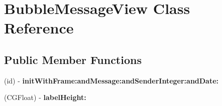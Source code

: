 \hypertarget{interface_bubble_message_view}{
\section{\-Bubble\-Message\-View \-Class \-Reference}
\label{interface_bubble_message_view}
}
\subsection*{\-Public \-Member \-Functions}
\begin{DoxyCompactItemize}
\item 
\hypertarget{interface_bubble_message_view_a5010516574a0ed333da7e16f36bf7502}{
(id) -\/ {\bfseries init\-With\-Frame\-:and\-Message\-:and\-Sender\-Integer\-:and\-Date\-:}}
\label{interface_bubble_message_view_a5010516574a0ed333da7e16f36bf7502}

\item 
\hypertarget{interface_bubble_message_view_a7cffc328ce7d8607d38e4d90e67b23fb}{
(\-C\-G\-Float) -\/ {\bfseries label\-Height\-:}}
\label{interface_bubble_message_view_a7cffc328ce7d8607d38e4d90e67b23fb}

\end{DoxyCompactItemize}
